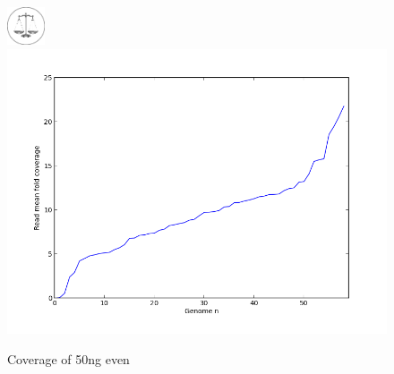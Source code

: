 \documentclass[a4paper,12pt]{report}
\begin{document}
\begin{figure}[ht!]
  \centering
    \includegraphics[width=0.1\textwidth]{figures/logos/even.png}\\
  \centering
      \includegraphics[width=\textwidth,trim=0 0 0 40, clip]{figures/notebooks/chris-mock-even-distribution.png}
  \caption{Coverage of 50ng even}
  \label{fig:coverage50ngeven}
\end{figure}
\end{document}
